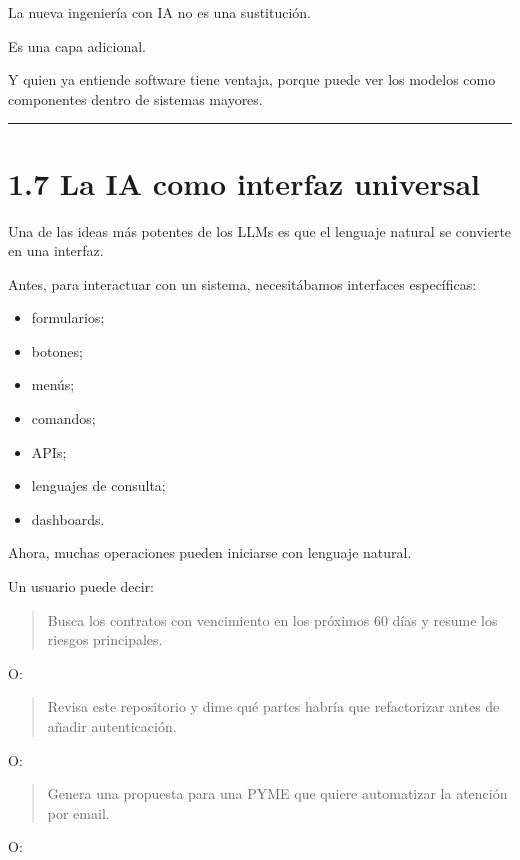 La nueva ingeniería con IA no es una sustitución.

Es una capa adicional.

Y quien ya entiende software tiene ventaja, porque puede ver los modelos
como componentes dentro de sistemas mayores.

\begin{center}\rule{0.5\linewidth}{0.5pt}\end{center}

\section{1.7 La IA como interfaz
universal}\label{la-ia-como-interfaz-universal}

Una de las ideas más potentes de los LLMs es que el lenguaje natural se
convierte en una interfaz.

Antes, para interactuar con un sistema, necesitábamos interfaces
específicas:

\begin{itemize}
\tightlist
\item
  formularios;
\item
  botones;
\item
  menús;
\item
  comandos;
\item
  APIs;
\item
  lenguajes de consulta;
\item
  dashboards.
\end{itemize}

Ahora, muchas operaciones pueden iniciarse con lenguaje natural.

Un usuario puede decir:

\begin{quote}
Busca los contratos con vencimiento en los próximos 60 días y resume los
riesgos principales.
\end{quote}

O:

\begin{quote}
Revisa este repositorio y dime qué partes habría que refactorizar antes
de añadir autenticación.
\end{quote}

O:

\begin{quote}
Genera una propuesta para una PYME que quiere automatizar la atención
por email.
\end{quote}

O:

